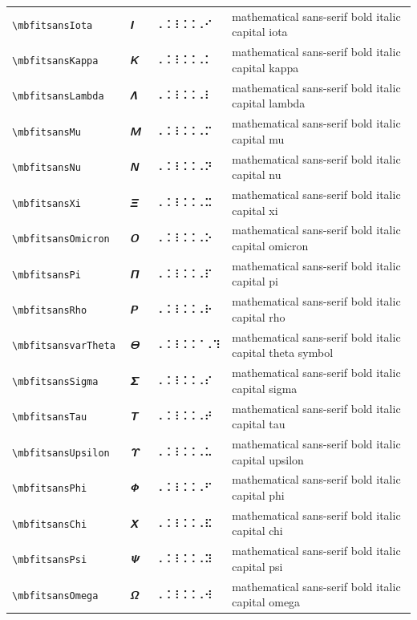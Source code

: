 \documentclass[oneside]{article}
\begin{document}
\begin{longtable}{llll}
\verb|\mbfitsansIota| & $\mbfitsansIota$ &  ⠠⠨⠸⠨⠨⠠⠊  & {mathematical sans-serif bold italic capital iota} \\[2ex]
\verb|\mbfitsansKappa| & $\mbfitsansKappa$ &  ⠠⠨⠸⠨⠨⠠⠅  & {mathematical sans-serif bold italic capital kappa} \\[2ex]
\verb|\mbfitsansLambda| & $\mbfitsansLambda$ &  ⠠⠨⠸⠨⠨⠠⠇  & {mathematical sans-serif bold italic capital lambda} \\[2ex]
\verb|\mbfitsansMu| & $\mbfitsansMu$ &  ⠠⠨⠸⠨⠨⠠⠍  & {mathematical sans-serif bold italic capital mu} \\[2ex]
\verb|\mbfitsansNu| & $\mbfitsansNu$ &  ⠠⠨⠸⠨⠨⠠⠝  & {mathematical sans-serif bold italic capital nu} \\[2ex]
\verb|\mbfitsansXi| & $\mbfitsansXi$ &  ⠠⠨⠸⠨⠨⠠⠭  & {mathematical sans-serif bold italic capital xi} \\[2ex]
\verb|\mbfitsansOmicron| & $\mbfitsansOmicron$ &  ⠠⠨⠸⠨⠨⠠⠕  & {mathematical sans-serif bold italic capital omicron} \\[2ex]
\verb|\mbfitsansPi| & $\mbfitsansPi$ &  ⠠⠨⠸⠨⠨⠠⠏  & {mathematical sans-serif bold italic capital pi} \\[2ex]
\verb|\mbfitsansRho| & $\mbfitsansRho$ &  ⠠⠨⠸⠨⠨⠠⠗  & {mathematical sans-serif bold italic capital rho} \\[2ex]
\verb|\mbfitsansvarTheta| & $\mbfitsansvarTheta$ &  ⠠⠨⠸⠨⠨⠈⠠⠹  & {mathematical sans-serif bold italic capital theta symbol} \\[2ex]
\verb|\mbfitsansSigma| & $\mbfitsansSigma$ &  ⠠⠨⠸⠨⠨⠠⠎  & {mathematical sans-serif bold italic capital sigma} \\[2ex]
\verb|\mbfitsansTau| & $\mbfitsansTau$ &  ⠠⠨⠸⠨⠨⠠⠞  & {mathematical sans-serif bold italic capital tau} \\[2ex]
\verb|\mbfitsansUpsilon| & $\mbfitsansUpsilon$ &  ⠠⠨⠸⠨⠨⠠⠥  & {mathematical sans-serif bold italic capital upsilon} \\[2ex]
\verb|\mbfitsansPhi| & $\mbfitsansPhi$ &  ⠠⠨⠸⠨⠨⠠⠋  & {mathematical sans-serif bold italic capital phi} \\[2ex]
\verb|\mbfitsansChi| & $\mbfitsansChi$ &  ⠠⠨⠸⠨⠨⠠⠯  & {mathematical sans-serif bold italic capital chi} \\[2ex]
\verb|\mbfitsansPsi| & $\mbfitsansPsi$ &  ⠠⠨⠸⠨⠨⠠⠽  & {mathematical sans-serif bold italic capital psi} \\[2ex]
\verb|\mbfitsansOmega| & $\mbfitsansOmega$ &  ⠠⠨⠸⠨⠨⠠⠺  & {mathematical sans-serif bold italic capital omega} \\[2ex]

\end{longtable}
\end{document}
